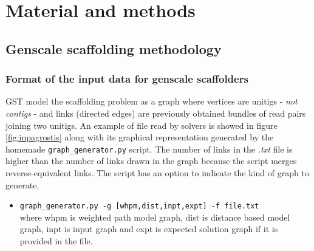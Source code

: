 \documentclass[12pt]{article}
\begin{document}

\newpage
\section{Material and methods} \label{sec:MatMet}
\subsection{Genscale scaffolding methodology}\label{sec:genscafmeth}
\subsubsection{Format of the input data for genscale scaffolders}
GST model the scaffolding problem as a graph where vertices are unitigs - \textit{not contigs} - and links (directed edges) are previously obtained bundles of read pairs joining two unitigs. An example of file read by solvers is showed in figure \ref{fig:inpagrostis} along with its graphical representation generated by the homemade \texttt{graph\_generator.py} script. The number of links in the \textit{.txt} file is higher than the number of links drawn in the graph because the script merges reverse-equivalent links. The script has an option to indicate the kind of graph to generate. 
\begin{itemize}
\item \texttt{graph\_generator.py -g [whpm,dist,inpt,expt] -f file.txt}\\ where whpm is weighted path model graph, dist is distance based model graph, inpt is input graph and expt is expected solution graph if it is provided in the file.
\end{itemize}
\end{document}
